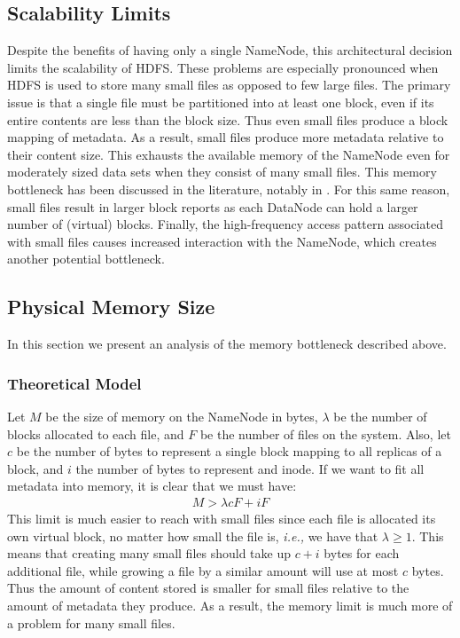 \documentclass[11pt, a4paper]{article}
\begin{document}
\begin{multicols*}{2}
\section{Scalability Limits}\label{ScalabilityLimits}
Despite the benefits of having only a single NameNode, this architectural decision limits the scalability of HDFS. These problems are especially pronounced when HDFS is used to store many small files as opposed to few large files. The primary issue is that a single file must be partitioned into at least one block, even if its entire contents are less than the block size. Thus even small files produce a block mapping of metadata. As a result, small files produce more metadata relative to their content size. This exhausts the available memory of the NameNode even for moderately sized data sets when they consist of many small files. This memory bottleneck has been discussed in the literature, notably in \cite{HdfsScale}. For this same reason, small files result in larger block reports as each DataNode can hold a larger number of (virtual) blocks. Finally, the high-frequency access pattern associated with small files causes increased interaction with the NameNode, which creates another potential bottleneck.

\subsection{Physical Memory Size}
In this section we present an analysis of the memory bottleneck described above.

\subsubsection{Theoretical Model}

Let $M$ be the size of memory on the NameNode in bytes, $\lambda$ be the number of blocks allocated to each file, and $F$ be the number of files on the system. Also, let $c$ be the number of bytes to represent a single block mapping to all replicas of a block, and $i$ the number of bytes to represent and inode. If we want to fit all metadata into memory, it is clear that we must have:
\begin{align*}
	M > \lambda c F + i F
\end{align*}
This limit is much easier to reach with small files since each file is allocated its own virtual block, no matter how small the file is, \textit{i.e.,} we have that $\lambda\geq 1$. This means that creating many small files should take up $c + i$ bytes for each additional file, while growing a file by a similar amount will use at most $c$ bytes. Thus the amount of content stored is smaller for small files relative to the amount of metadata they produce. As a result, the memory limit is much more of a problem for many small files. 
	

\end{multicols*}
\end{document}
